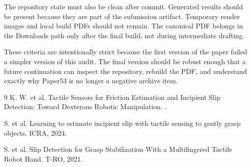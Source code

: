 \documentclass{article}
\begin{document}
The repository state must also be clean after commit. Generated results should be present because they are part of the submission artifact. Temporary render images and local build PDFs should not remain. The canonical PDF belongs in the Downloads path only after the final build, not during intermediate drafting.

These criteria are intentionally strict because the first version of the paper failed a simpler version of this audit. The final version should be robust enough that a future continuation can inspect the repository, rebuild the PDF, and understand exactly why Paper53 is no longer a negative archive item.

\begin{thebibliography}{9}
K. W. et al.
\newblock Tactile Sensors for Friction Estimation and Incipient Slip Detection: Toward Dexterous Robotic Manipulation.
.

S. et al.
\newblock Learning to estimate incipient slip with tactile sensing to gently grasp objects.
\newblock ICRA, 2024.

S. et al.
\newblock Slip Detection for Grasp Stabilization With a Multifingered Tactile Robot Hand.
\newblock T-RO, 2021.
\end{thebibliography}
\end{document}
